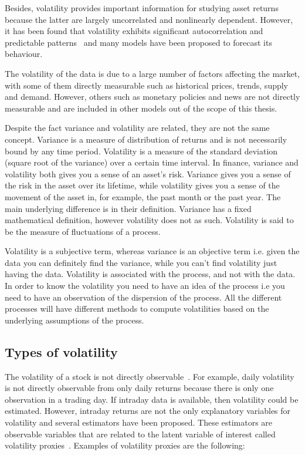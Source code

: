 Besides, volatility provides important information for studying asset returns
because the latter are largely uncorrelated and nonlinearly dependent. However,
it has been found that volatility exhibits significant autocorrelation and
predictable patterns~\cite{poon+granger2003} and  many models have been
proposed to forecast its behaviour. 

The volatility of the data is due to a large number of factors affecting the
market, with some of them directly measurable such as historical prices,
trends, supply and demand. However, others such as monetary policies and news
are not directly measurable and are included in other models out of the scope
of this thesis. 


Despite the fact variance and volatility are related, they are not the same concept. Variance is a measure of distribution of returns and is not necessarily
bound by any time period.  Volatility is a measure of the standard deviation
(square root of the variance) over a certain time interval. In finance,
variance and volatility both gives you a sense of an asset's risk. Variance
gives you a sense of the risk in the asset over its lifetime, while volatility
gives you a sense of the movement of the asset in, for example, the past month or the
past year. The main underlying difference is in their definition. Variance has a
fixed mathematical definition, however volatility does not as such. Volatility
is said to be the measure of fluctuations of a process.

Volatility is a subjective term, whereas variance is an objective term i.e.
given the data you can definitely find the variance, while you can't find
volatility just having the data. Volatility is associated with the process, and
not with the data. In order to know the volatility you need to have an idea of the process i.e you
need to have an observation of the dispersion of the process. All the different
processes will have different methods to compute volatilities based on the
underlying assumptions of the process.  

\subsection{Types of volatility}

The volatility of a stock is not directly observable~\cite{tsay2005,engle1993}. For example, daily volatility is not directly observable from only daily returns because there is only one observation in a trading day.  If intraday data is available, then volatility could be estimated. However, intraday returns are not the only explanatory variables for volatility and several estimators have been proposed. These estimators are observable variables that are related to the latent variable of interest called volatility proxies~\cite{devilderetal2007}. Examples of volatility proxies are the following: 



